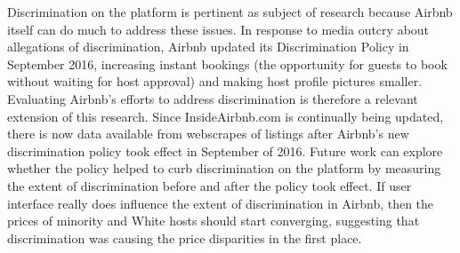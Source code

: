 \documentclass[11pt, oneside]{article}
\begin{document}
Discrimination on the platform is pertinent as subject of research because Airbnb itself can do much to address these issues. 
In response to media outcry about allegations of discrimination, Airbnb updated its Discrimination Policy in September 2016, increasing instant bookings (the opportunity for guests to book without waiting for host approval) and making host profile pictures smaller. Evaluating Airbnb's efforts to address discrimination is therefore a relevant extension of this research. Since InsideAirbnb.com is continually being updated, there is now data available from webscrapes of listings after Airbnb's new discrimination policy took effect in September of 2016. Future work can explore whether the policy helped to curb discrimination on the platform by measuring the extent of discrimination before and after the policy took effect. If user interface really does influence the extent of discrimination in Airbnb, then the prices of minority and White hosts should start converging, suggesting that discrimination was causing the price disparities in the first place. 
\end{document}
